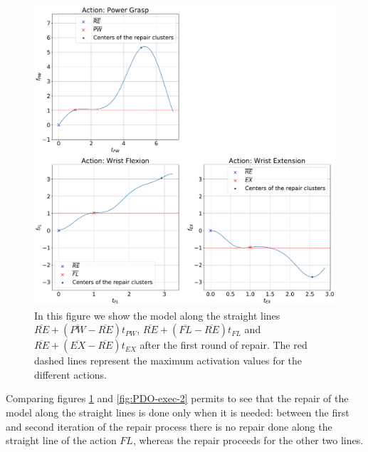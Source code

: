 \begin{figure}[ht]
    \centering
    \includegraphics[width=\textwidth]{Images/repair-example/PDO-State1.pdf}
    \caption{In this figure we show the model along the straight lines $\overline{RE} + (\overline{PW} - \overline{RE})t_{PW}$, $\overline{RE} + (\overline{FL} - \overline{RE})t_{FL}$ and $\overline{RE} + (\overline{EX} - \overline{RE})t_{EX}$ after the first round of repair. The red dashed lines represent the maximum activation values for the different actions.}
    \label{fig:PDO-exec-1}
\end{figure}
Comparing figures \ref{fig:PDO-exec-1} and \ref{fig:PDO-exec-2} permits to see that the repair of the model along the straight lines is done only when it is needed: between the first and second iteration of the repair process there is no repair done along the straight line of the action $FL$, whereas the repair proceeds for the other two lines.
